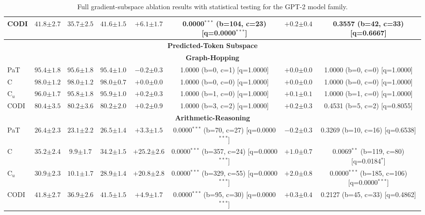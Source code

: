 \begin{table}[h!]
\begin{tabular}{l ccc cc cc}
CODI & $41.8 {\scriptstyle \pm 2.7}$ & $35.7 {\scriptstyle \pm 2.5}$ & $41.6 {\scriptstyle \pm 1.5}$ & $+6.1 {\scriptstyle \pm 1.7}$ & 0.0000$^{***}$ (b=104, c=23) [q=0.0000$^{***}$] & $+0.2 {\scriptstyle \pm 0.4}$ & 0.3557 (b=42, c=33) [q=0.6667] \\
\midrule
\multicolumn{8}{c}{\textbf{Predicted-Token Subspace}} \\
\midrule
\multicolumn{8}{c}{\textbf{Graph-Hopping}} \\
\midrule
PaT & $95.4 {\scriptstyle \pm 1.8}$ & $95.6 {\scriptstyle \pm 1.8}$ & $95.4 {\scriptstyle \pm 1.0}$ & $-0.2 {\scriptstyle \pm 0.3}$ & 1.0000 (b=0, c=1) [q=1.0000] & $+0.0 {\scriptstyle \pm 0.0}$ & 1.0000 (b=0, c=0) [q=1.0000] \\
C & $98.0 {\scriptstyle \pm 1.2}$ & $98.0 {\scriptstyle \pm 1.2}$ & $98.0 {\scriptstyle \pm 0.7}$ & $+0.0 {\scriptstyle \pm 0.0}$ & 1.0000 (b=0, c=0) [q=1.0000] & $+0.0 {\scriptstyle \pm 0.0}$ & 1.0000 (b=0, c=0) [q=1.0000] \\
C$_u$ & $96.0 {\scriptstyle \pm 1.7}$ & $95.8 {\scriptstyle \pm 1.8}$ & $95.9 {\scriptstyle \pm 1.0}$ & $+0.2 {\scriptstyle \pm 0.3}$ & 1.0000 (b=1, c=0) [q=1.0000] & $+0.1 {\scriptstyle \pm 0.1}$ & 1.0000 (b=1, c=0) [q=1.0000] \\
CODI & $80.4 {\scriptstyle \pm 3.5}$ & $80.2 {\scriptstyle \pm 3.6}$ & $80.2 {\scriptstyle \pm 2.0}$ & $+0.2 {\scriptstyle \pm 0.9}$ & 1.0000 (b=3, c=2) [q=1.0000] & $+0.2 {\scriptstyle \pm 0.3}$ & 0.4531 (b=5, c=2) [q=0.8055] \\
\midrule
\multicolumn{8}{c}{\textbf{Arithmetic-Reasoning}} \\
\midrule
PaT & $26.4 {\scriptstyle \pm 2.3}$ & $23.1 {\scriptstyle \pm 2.2}$ & $26.5 {\scriptstyle \pm 1.4}$ & $+3.3 {\scriptstyle \pm 1.5}$ & 0.0000$^{***}$ (b=70, c=27) [q=0.0000$^{***}$] & $-0.2 {\scriptstyle \pm 0.3}$ & 0.3269 (b=10, c=16) [q=0.6538] \\
C & $35.2 {\scriptstyle \pm 2.4}$ & $9.9 {\scriptstyle \pm 1.7}$ & $34.2 {\scriptstyle \pm 1.5}$ & $+25.2 {\scriptstyle \pm 2.6}$ & 0.0000$^{***}$ (b=357, c=24) [q=0.0000$^{***}$] & $+1.0 {\scriptstyle \pm 0.7}$ & 0.0069$^{**}$ (b=119, c=80) [q=0.0184$^{*}$] \\
C$_u$ & $30.9 {\scriptstyle \pm 2.3}$ & $10.1 {\scriptstyle \pm 1.7}$ & $28.9 {\scriptstyle \pm 1.4}$ & $+20.8 {\scriptstyle \pm 2.8}$ & 0.0000$^{***}$ (b=329, c=55) [q=0.0000$^{***}$] & $+2.0 {\scriptstyle \pm 0.8}$ & 0.0000$^{***}$ (b=185, c=106) [q=0.0000$^{***}$] \\
CODI & $41.8 {\scriptstyle \pm 2.7}$ & $36.9 {\scriptstyle \pm 2.6}$ & $41.5 {\scriptstyle \pm 1.5}$ & $+4.9 {\scriptstyle \pm 1.7}$ & 0.0000$^{***}$ (b=95, c=30) [q=0.0000$^{***}$] & $+0.3 {\scriptstyle \pm 0.4}$ & 0.2127 (b=45, c=33) [q=0.4862] \\
\bottomrule
\end{tabular}
\caption{Full gradient-subspace ablation results with statistical testing for the GPT-2 model family.}
\label{tab:gradsubspace_ablation_stats_gpt2}
\end{table}

